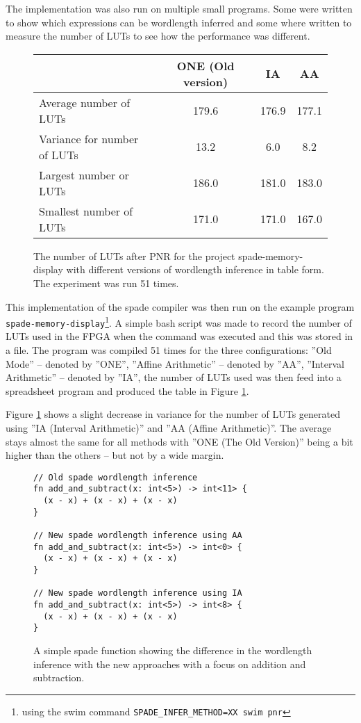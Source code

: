The implementation was also run on multiple small programs. Some were written to show which expressions can be wordlength inferred and some where written to measure the number of LUTs to see how the performance was different. 

\begin{figure}
\begin{center}
\begin{tabular}{l | c c c}
  & ONE (Old version) & IA & AA \\
\hline
Average number of LUTs&179.6&176.9 & 177.1 \\
Variance for number of LUTs &13.2&6.0&8.2 \\
Largest number or LUTs&186.0&181.0&183.0 \\
Smallest number of LUTs&171.0&171.0&167.0 \\
\end{tabular}
  \caption{The number of LUTs after PNR for the project spade-memory-display with different versions of wordlength inference in table form. The experiment was run 51 times.}
  \label{fig:SpadeCompilations50Table}
\end{center}
\end{figure}

This implementation of the spade compiler was then run on the example program \verb+spade-memory-display+\cprotect\footnote{using the swim command \verb+SPADE_INFER_METHOD=XX swim pnr+}. A simple bash script was made to record the number of LUTs used in the FPGA when the command was executed and this was stored in a file. The program was compiled 51 times for the three configurations: ''Old Mode'' -- denoted by ''ONE'', ''Affine Arithmetic'' -- denoted by ''AA'', ''Interval Arithmetic'' -- denoted by ''IA'', the number of LUTs used was then feed into a spreadsheet program and produced the table in Figure \ref{fig:SpadeCompilations50Table}.

Figure \ref{fig:SpadeCompilations50Table} shows a slight decrease in variance for the number of LUTs generated using ''IA (Interval Arithmetic)'' and ''AA (Affine Arithmetic)''. The average stays almost the same for all methods with ''ONE (The Old Version)'' being a bit higher than the others -- but not by a wide margin.

\begin{figure}
\begin{verbatim}
// Old spade wordlength inference
fn add_and_subtract(x: int<5>) -> int<11> {
  (x - x) + (x - x) + (x - x)
}

// New spade wordlength inference using AA
fn add_and_subtract(x: int<5>) -> int<0> {
  (x - x) + (x - x) + (x - x)
}

// New spade wordlength inference using IA
fn add_and_subtract(x: int<5>) -> int<8> {
  (x - x) + (x - x) + (x - x)
}
\end{verbatim}
  \caption{A simple spade function showing the difference in the wordlength inference with the new approaches with a focus on addition and subtraction.}
  \label{fig:CodeThatWorksNow}
\end{figure}

